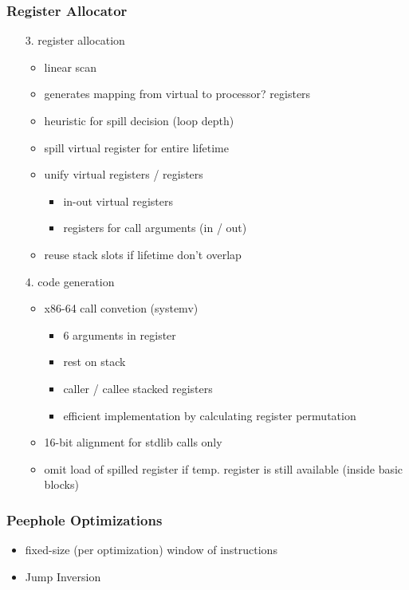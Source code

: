 \documentclass[navbaroff,en]{sdqbeamer}
\begin{document}
\begin{frame}
    \frametitle{Register Allocator}

    \begin{itemize}
        \item[3.] register allocation
        \begin{itemize}
            \item linear scan
            \item generates mapping from virtual to processor? registers
            \item heuristic for spill decision (loop depth)
            \item spill virtual register for entire lifetime
            \item unify virtual registers / registers
            \begin{itemize}
                \item in-out virtual registers
                \item registers for call arguments (in / out)
            \end{itemize}
            \item reuse stack slots if lifetime don't overlap
        \end{itemize}
        \item[4.] code generation
        \begin{itemize}
            \item x86-64 call convetion (systemv)
            \begin{itemize}
                \item 6 arguments in register
                \item rest on stack
                \item caller / callee stacked registers
                \item efficient implementation by calculating register permutation
            \end{itemize}
            \item 16-bit alignment for stdlib calls only
            \item omit load of spilled register if temp. register is still available (inside basic blocks)
        \end{itemize}
    \end{itemize}

\end{frame}

\begin{frame}
    \frametitle{Peephole Optimizations}

    \begin{itemize}
        \item fixed-size (per optimization) window of instructions
        \vspace{1em}
        \item Jump Inversion
    \end{itemize}

\end{frame}
\end{document}
